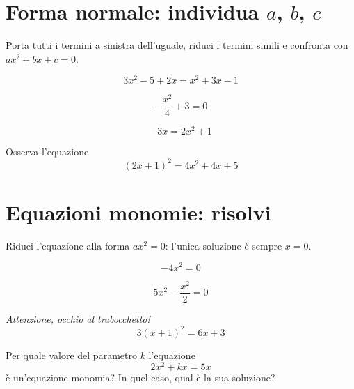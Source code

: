 \documentclass[11pt]{report}
\begin{document}
\section{Forma normale: individua $a$, $b$, $c$}

\begin{mdframed}
Porta tutti i termini a sinistra dell'uguale, riduci i termini simili e confronta con $ax^2+bx+c=0$.
\end{mdframed}

\begin{exercise}[\onestar]
$$
3x^2-5+2x=x^2+3x-1
$$
\end{exercise}

\begin{exercise}[\onestar]
$$
-\frac{x^2}{4}+3=0
$$
\end{exercise}

\begin{exercise}[\onestar]
$$
-3x = 2x^2+1
$$
\end{exercise}

\begin{exercise}[\threestars]
Osserva l'equazione
$$
(2x+1)^2 = 4x^2+4x+5
$$
\begin{truthorfalse}
\end{truthorfalse}
\end{exercise}

\section{Equazioni monomie: risolvi}

\begin{mdframed}
Riduci l'equazione alla forma $ax^2=0$: l'unica soluzione è sempre $x=0$.
\end{mdframed}

\begin{exercise}[\onestar]
$$
-4x^2=0
$$
\end{exercise}

\begin{exercise}[\onestar]
$$
5x^2 - \frac{x^2}{2} = 0
$$
\end{exercise}

\begin{exercise}[\twostars]
\textit{Attenzione, occhio al trabocchetto!}
$$
3(x+1)^2 = 6x+3
$$
\end{exercise}

\begin{exercise}[\threestars]
Per quale valore del parametro $k$ l'equazione
$$
2x^2+kx=5x
$$
è un'equazione monomia? In quel caso, qual è la sua soluzione?
\end{exercise}
\end{document}
